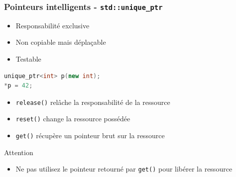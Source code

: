 \documentclass[C++.tex]{subfiles}
\begin{document}
\begin{frame}[fragile]
	\frametitle{Pointeurs intelligents - \lstinline|std::unique_ptr|}
	\begin{itemize}
		\item Responsabilité exclusive
		\item Non copiable mais déplaçable
		\item Testable
	\end{itemize}

	\begin{lstlisting}[language=C++]
unique_ptr<int> p(new int);
*p = 42;\end{lstlisting}

	\begin{itemize}
		\item \lstinline|release()| relâche la responsabilité de la ressource


		\item \lstinline|reset()| change la ressource possédée


		\item \lstinline|get()| récupère un pointeur brut sur la ressource

	\end{itemize}

	\begin{alertblock}{Attention}
		\begin{itemize}
			\item Ne pas utilisez le pointeur retourné par \lstinline|get()| pour libérer la ressource
		\end{itemize}
	\end{alertblock}
\end{frame}
\end{document}
